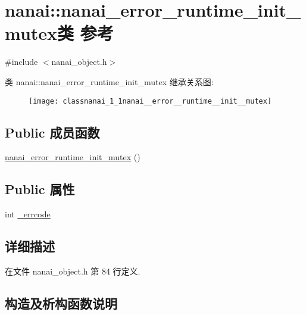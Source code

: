 \hypertarget{classnanai_1_1nanai__error__runtime__init__mutex}{}\section{nanai\+:\+:nanai\+\_\+error\+\_\+runtime\+\_\+init\+\_\+mutex类 参考}
\label{classnanai_1_1nanai__error__runtime__init__mutex}


{\ttfamily \#include $<$nanai\+\_\+object.\+h$>$}

类 nanai\+:\+:nanai\+\_\+error\+\_\+runtime\+\_\+init\+\_\+mutex 继承关系图\+:\begin{figure}[H]
\begin{center}
\leavevmode
\texttt{[image: classnanai\_1\_1nanai\_\_error\_\_runtime\_\_init\_\_mutex]}
\end{center}
\end{figure}
\subsection*{Public 成员函数}
\begin{DoxyCompactItemize}
\item 
\hyperlink{classnanai_1_1nanai__error__runtime__init__mutex_a0013394fd311166a8407be53eba690a6}{nanai\+\_\+error\+\_\+runtime\+\_\+init\+\_\+mutex} ()
\end{DoxyCompactItemize}
\subsection*{Public 属性}
\begin{DoxyCompactItemize}
\item 
int \hyperlink{classnanai_1_1nanai__error__runtime__init__mutex_a9cf39ee56a510b20711a828030b72c96}{\+\_\+errcode}
\end{DoxyCompactItemize}


\subsection{详细描述}


在文件 nanai\+\_\+object.\+h 第 84 行定义.



\subsection{构造及析构函数说明}
\hypertarget{classnanai_1_1nanai__error__runtime__init__mutex_a0013394fd311166a8407be53eba690a6}{}

